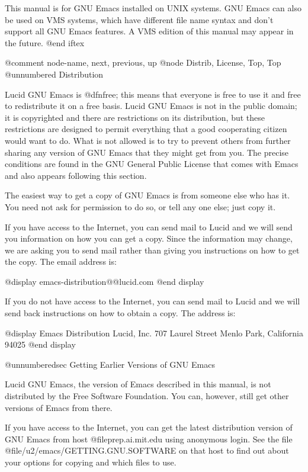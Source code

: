 This manual is for GNU Emacs installed on UNIX systems.  GNU
Emacs can also be used on VMS systems, which have different file name
syntax and don't support all GNU Emacs features.  A VMS edition of this
manual may appear in the future.
@end iftex

@comment  node-name,  next,  previous,  up
@node Distrib, License, Top, Top
@unnumbered Distribution

Lucid GNU Emacs is @dfn{free}; this means that everyone is free to use it and
free to redistribute it on a free basis.  Lucid GNU Emacs is not in the public
domain; it is copyrighted and there are restrictions on its
distribution, but these restrictions are designed to permit everything
that a good cooperating citizen would want to do.  What is not allowed
is to try to prevent others from further sharing any version of GNU
Emacs that they might get from you.  The precise conditions are found in
the GNU General Public License that comes with Emacs and also appears
following this section.

The easiest way to get a copy of GNU Emacs is from someone else who has it.
You need not ask for permission to do so, or tell any one else; just copy
it.

If you have access to the Internet, you can send mail to Lucid and we
will send you information on how you can get a copy. Since the
information may change, we are asking you to send mail rather than
giving you instructions on how to get the copy. The email address is: 

@display
emacs-distribution@@lucid.com
@end display

If you do not have access to the Internet, you can send mail to Lucid
and we will send back instructions on how to obtain a copy. The
address is: 

@display 
Emacs Distribution
Lucid, Inc.
707 Laurel Street
Menlo Park, California 94025
@end display

@unnumberedsec Getting Earlier Versions of GNU Emacs

Lucid GNU Emacs, the version of Emacs described in this manual, is not
distributed by the Free Software Foundation. You can, however, still get
other versions of Emacs from there.

If you have access to the Internet, you can get the latest distribution
version of GNU Emacs from host @file{prep.ai.mit.edu} using anonymous
login.  See the file @file{/u2/emacs/GETTING.GNU.SOFTWARE} on that host
to find out about your options for copying and which files to use.


